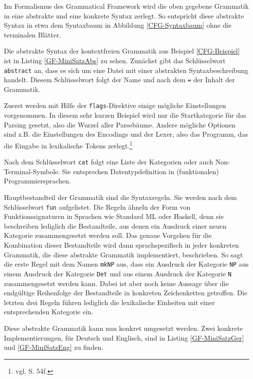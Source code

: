 Im Formalismus des Grammatical Framework wird die oben gegebene Grammatik in eine abstrakte und eine konkrete Syntax zerlegt. So entspricht diese abstrakte Syntax in etwa dem Syntaxbaum in Abbildung \ref{CFG-Syntaxbaum} ohne die terminalen Blätter. \par

Die abstrakte Syntax der kontextfreien Grammatik aus Beispiel \ref{CFG-Beispiel} ist in Listing \ref{GF-MiniSatzAbs} zu sehen. Zunächst gibt das Schlüsselwort \texttt{abstract} an, dass es sich um eine Datei mit einer abstrakten Syntaxbeschreibung handelt. Diesem Schlüsselwort folgt der Name und nach dem \texttt{=} der Inhalt der Grammatik. \par
Zuerst werden mit Hilfe der \texttt{flags}-Direktive einige mögliche Einstellungen vorgenommen. In diesem sehr kurzen Beispiel wird nur die Startkategorie für das Parsing gesetzt, also die Wurzel aller Parsebäume. Andere mögliche Optionen sind z.B. die Einstellungen des Encodings und der Lexer, also das Programm, das die Eingabe in lexikalische Tokens zerlegt.\footnote{vgl. \cite{RANTA2011} S. 54f.} \par
Nach dem Schlüsselwort \texttt{cat} folgt eine Liste der Kategorien oder auch Non-Terminal-Symbole. Sie entsprechen Datentypdefinition in (funktionalen) Programmiersprachen. \par
Hauptbestandteil der Grammatik sind die Syntaxregeln. Sie werden nach dem Schlüsselwort \texttt{fun} aufgelistet. Die Regeln ähneln der Form von Funktionssignaturen in Sprachen wie Standard ML oder Haskell, denn sie beschreiben lediglich die Bestandteile, aus denen ein Ausdruck einer neuen Kategorie zusammengesetzt werden soll. Das genaue Vorgehen für die Kombination dieser Bestandteile wird dann sprachspezifisch in jeder konkreten Grammatik, die diese abstrakte Grammatik implementiert, beschrieben. So sagt die erste Regel mit dem Namen \texttt{mkNP} aus, dass ein Ausdruck der Kategorie \texttt{NP} aus einem Ausdruck der Kategorie \texttt{Det} und aus einem Ausdruck der Kategorie \texttt{N} zusammengesetzt werden kann. Dabei ist aber noch keine Aussage über die endgültige Reihenfolge der Bestandteile in konkreten Zeichenketten getroffen. Die letzten drei Regeln führen lediglich die lexikalische Einheiten mit einer entsprechenden Kategorie ein. \par
Diese abstrakte Grammatik kann nun konkret umgesetzt werden. Zwei konkrete Implementierungen, für Deutsch und Englisch, sind in Listing \ref{GF-MiniSatzGer} und \ref{GF-MiniSatzEng} zu finden. \par
